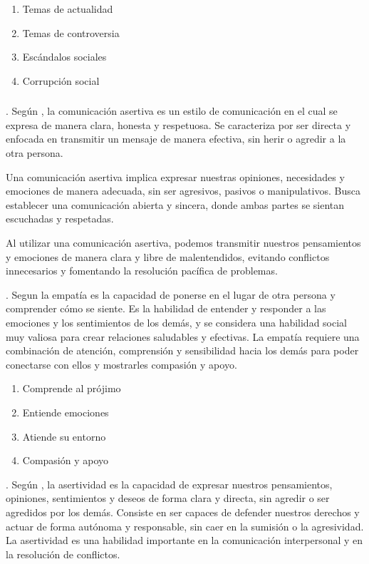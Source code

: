 \documentclass[12pt,a4paper]{article}
\begin{document}
\begin{enumerate}
	\item  Temas de actualidad
	\item  Temas de controversia
	\item  Escándalos sociales
	\item  Corrupción social
\end{enumerate}


\subsubsection{\variabled}. Según \cite{canas_comunicacion_2019}, la comunicación asertiva es un estilo de comunicación en el cual se expresa de manera clara, honesta y respetuosa. Se caracteriza por ser directa y enfocada en transmitir un mensaje de manera efectiva, sin herir o agredir a la otra persona.

Una comunicación asertiva implica expresar nuestras opiniones, necesidades y emociones de manera adecuada, sin ser agresivos, pasivos o manipulativos. Busca establecer una comunicación abierta y sincera, donde ambas partes se sientan escuchadas y respetadas.

Al utilizar una comunicación asertiva, podemos transmitir nuestros pensamientos y emociones de manera clara y libre de malentendidos, evitando conflictos innecesarios y fomentando la resolución pacífica de problemas.

\noindent\textbf{\dimd}. Segun \cite{lachira_estrada_comunicacion_2020} la empatía es la capacidad de ponerse en el lugar de otra persona y comprender cómo se siente. Es la habilidad de entender y responder a las emociones y los sentimientos de los demás, y se considera una habilidad social muy valiosa para crear relaciones saludables y efectivas. La empatía requiere una combinación de atención, comprensión y sensibilidad hacia los demás para poder conectarse con ellos y mostrarles compasión y apoyo.

\begin{enumerate}
	\item  Comprende al prójimo
	\item  Entiende emociones
	\item  Atiende su entorno
	\item  Compasión y apoyo
\end{enumerate}

\noindent\textbf{\dimdd}. Según \cite{canas_comunicacion_2019},	la asertividad es la capacidad de expresar nuestros pensamientos, opiniones, sentimientos y deseos de forma clara y directa, sin agredir o ser agredidos por los demás. Consiste en ser capaces de defender nuestros derechos y actuar de forma autónoma y responsable, sin caer en la sumisión o la agresividad. La asertividad es una habilidad importante en la comunicación interpersonal y en la resolución de conflictos.
\end{document}
